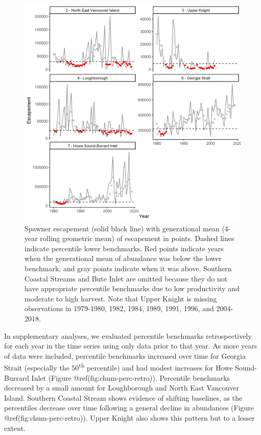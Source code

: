 \documentclass[
]{article}
\begin{document}
\begin{figure}

{\centering \includegraphics[width=29.17in]{figure/fig_percentile_bm_rel_abd} 

}

\caption{Spawner escapement (solid black line) with generational mean (4-year rolling geometric mean) of escapement in points. Dashed lines indicate percentile lower benchmarks. Red points indicate years when the generational mean of abundance was below the lower benchmark, and gray points indicate when it was above. Southern Coastal Streams and Bute Inlet are omitted because they do not have appropriate percentile benchmarks due to low productivity and moderate to high harvest. Note that Upper Knight is missing observations in 1979-1980, 1982, 1984, 1989, 1991, 1996, and 2004-2018.}\label{fig:chum-perc-status-static}
\end{figure}

In supplementary analyses, we evaluated percentile benchmarks
retrospectively for each year in the time series using only data prior
to that year. As more years of data were included, percentile benchmarks
increased over time for Georgia Strait (especially the
50\textsuperscript{th} percentile) and had modest increases for Howe
Sound-Burrard Inlet (Figure @ref(fig:chum-perc-retro)). Percentile
benchmarks decreased by a small amount for Loughborough and North East
Vancouver Island. Southern Coastal Stream shows evidence of shifting
baselines, as the percentiles decrease over time following a general
decline in abundances (Figure @ref(fig:chum-perc-retro)). Upper Knight
also shows this pattern but to a lesser extent.
\end{document}
